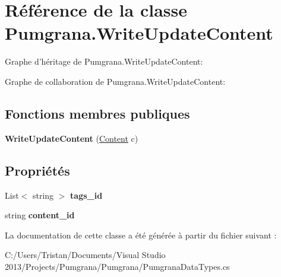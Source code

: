 \hypertarget{class_pumgrana_1_1_write_update_content}{\section{Référence de la classe Pumgrana.\+Write\+Update\+Content}
\label{class_pumgrana_1_1_write_update_content}
}


Graphe d'héritage de Pumgrana.\+Write\+Update\+Content\+:


Graphe de collaboration de Pumgrana.\+Write\+Update\+Content\+:
\subsection*{Fonctions membres publiques}
\begin{DoxyCompactItemize}
\item 
\hypertarget{class_pumgrana_1_1_write_update_content_a1b5cf11da8d928586b47a077ccb2be03}{{\bfseries Write\+Update\+Content} (\hyperlink{class_pumgrana_1_1_content}{Content} c)}\label{class_pumgrana_1_1_write_update_content_a1b5cf11da8d928586b47a077ccb2be03}

\end{DoxyCompactItemize}
\subsection*{Propriétés}
\begin{DoxyCompactItemize}
\item 
\hypertarget{class_pumgrana_1_1_write_update_content_a6ca3a33a3093d4c60c7dc2ad8d495864}{List$<$ string $>$ {\bfseries tags\+\_\+id}}\label{class_pumgrana_1_1_write_update_content_a6ca3a33a3093d4c60c7dc2ad8d495864}

\item 
\hypertarget{class_pumgrana_1_1_write_update_content_a9c66c1dd702311ddde22e62c752604dd}{string {\bfseries content\+\_\+id}}\label{class_pumgrana_1_1_write_update_content_a9c66c1dd702311ddde22e62c752604dd}

\end{DoxyCompactItemize}


La documentation de cette classe a été générée à partir du fichier suivant \+:\begin{DoxyCompactItemize}
\item 
C\+:/\+Users/\+Tristan/\+Documents/\+Visual Studio 2013/\+Projects/\+Pumgrana/\+Pumgrana/Pumgrana\+Data\+Types.\+cs\end{DoxyCompactItemize}
